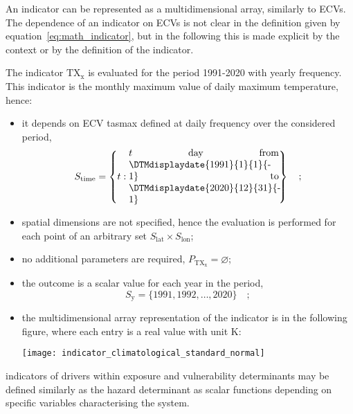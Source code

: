 An \gls{indicator} can be represented as a multidimensional array, similarly to \glspl{ECV}.
The dependence of an \gls{indicator} on \glspl{ECV} is not clear in the definition given by equation~\eqref{eq:math_indicator}, but in the following this is made explicit by the context or by the definition of the \gls{indicator}.

\begin{example}
  The \gls{indicator} $\mathrm{TX_x}$ is evaluated for the period 1991-2020 with yearly frequency. This \gls{indicator} is the monthly maximum value of daily maximum temperature,\cite{ETCCDIClimate} hence:
  \begin{itemize}
    \item it depends on \gls{ECV} \glsdesc{tasmax} defined at daily frequency over the considered period,
      \begin{equation*}
        S_\text{time} = \left\{ t : \parbox{0.45\linewidth}{$t$ day from \DTMdisplaydate{1991}{1}{1}{-1} to \DTMdisplaydate{2020}{12}{31}{-1}} \right\}
        \quad ;
      \end{equation*}
    \item spatial dimensions are not specified, hence the evaluation is performed for each point of an arbitrary set $S_\text{lat} \times S_\text{lon}$;
    \item no additional parameters are required, $P_\mathrm{TX_x} = \varnothing$;
    \item the outcome is a scalar value for each year in the period,
      \begin{equation*}
        S_\text{y} = \{ 1991, 1992, \dots, 2020 \}
        \quad ;
      \end{equation*}
    \item the multidimensional array representation of the \gls{indicator} is in the following figure, where each entry is a real value with unit \unit{\kelvin}:
      \begin{center}
        \texttt{[image: indicator\_climatological\_standard\_normal]}
      \end{center}
  \end{itemize}
\end{example}

\Glspl{indicator} of \glspl{driver} within \gls{exposure} and \gls{vulnerability} \glspl{determinant} may be defined similarly as the \gls{hazard} \gls{determinant} as scalar functions depending on specific variables characterising the system.

